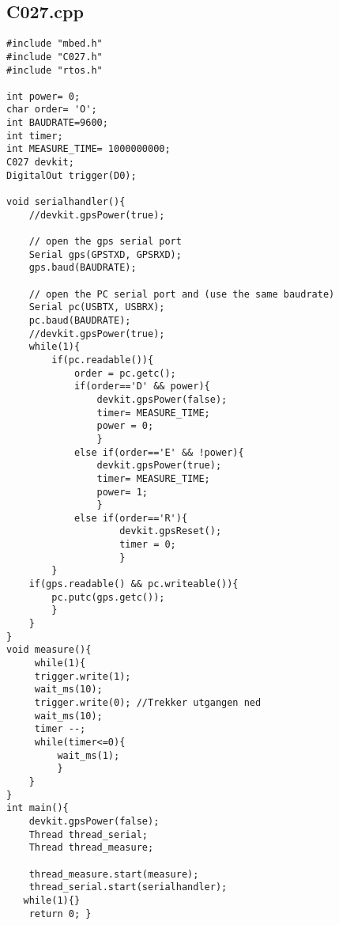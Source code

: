 \begin{appendices}
\chapter{C027.cpp}
\begin{lstlisting}
#include "mbed.h"
#include "C027.h"
#include "rtos.h"

int power= 0;
char order= 'O';
int BAUDRATE=9600;
int timer;
int MEASURE_TIME= 1000000000;
C027 devkit;
DigitalOut trigger(D0);

void serialhandler(){
    //devkit.gpsPower(true);
    
    // open the gps serial port
    Serial gps(GPSTXD, GPSRXD);
    gps.baud(BAUDRATE);
    
    // open the PC serial port and (use the same baudrate)
    Serial pc(USBTX, USBRX);
    pc.baud(BAUDRATE);
    //devkit.gpsPower(true);
    while(1){
        if(pc.readable()){
            order = pc.getc();
            if(order=='D' && power){
                devkit.gpsPower(false);
                timer= MEASURE_TIME;
                power = 0;
                }
            else if(order=='E' && !power){
                devkit.gpsPower(true);
                timer= MEASURE_TIME;
                power= 1;
                }
            else if(order=='R'){
                    devkit.gpsReset();
                    timer = 0;
                    }  
        }
    if(gps.readable() && pc.writeable()){
        pc.putc(gps.getc());
        }
    }
}
void measure(){
     while(1){
     trigger.write(1);
     wait_ms(10);
     trigger.write(0); //Trekker utgangen ned
     wait_ms(10);
     timer --;
     while(timer<=0){
         wait_ms(1);
         }
    }
}
int main(){
    devkit.gpsPower(false);
    Thread thread_serial;
    Thread thread_measure;
    
    thread_measure.start(measure);
    thread_serial.start(serialhandler);
   while(1){}
    return 0; }
\end{lstlisting}
\label{Appendix:C027.Cpp}

\end{appendices}